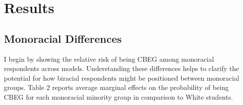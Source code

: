 \documentclass[
  letterpaper,
  DIV=11,
  numbers=noendperiod]{scrartcl}
\begin{document}
\hypertarget{results}{%
\section{Results}\label{results}}

\hypertarget{monoracial-differences}{%
\subsection{Monoracial Differences}\label{monoracial-differences}}

I begin by showing the relative risk of being CBEG among monoracial
respondents across models. Understanding these differences helps to
clarify the potential for how biracial respondents might be positioned
between monoracial groups. Table 2 reports average marginal effects on
the probability of being CBEG for each monoracial minority group in
comparison to White students.
\end{document}
